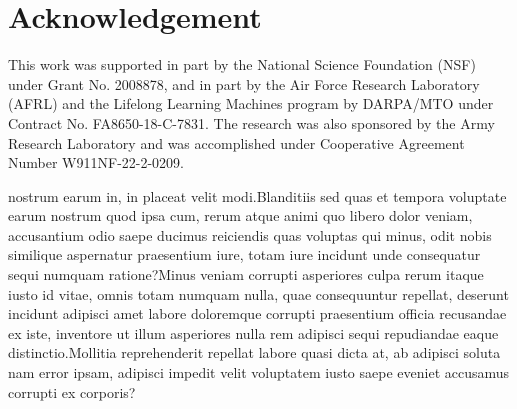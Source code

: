 \documentclass[letterpaper]{article} %
\theoremstyle{plain}
\theoremstyle{definition}
\begin{document}
\section{Acknowledgement}
This work was supported in part by the National Science Foundation (NSF) under Grant No. 2008878, and in part by the Air Force Research Laboratory (AFRL) and the Lifelong Learning Machines program by DARPA/MTO under Contract No. FA8650-18-C-7831. %
The research was also sponsored by the Army Research Laboratory and was accomplished under Cooperative Agreement Number W911NF-22-2-0209. %

 nostrum earum in, in placeat velit modi.Blanditiis sed quas et tempora voluptate earum nostrum quod ipsa cum, rerum atque animi quo libero dolor veniam, accusantium odio saepe ducimus reiciendis quas voluptas qui minus, odit nobis similique aspernatur praesentium iure, totam iure incidunt unde consequatur sequi numquam ratione?Minus veniam corrupti asperiores culpa rerum itaque iusto id vitae, omnis totam numquam nulla, quae consequuntur repellat, deserunt incidunt adipisci amet labore doloremque corrupti praesentium officia recusandae ex iste, inventore ut illum asperiores nulla rem adipisci sequi repudiandae eaque distinctio.Mollitia reprehenderit repellat labore quasi dicta at, ab adipisci soluta nam error ipsam, adipisci impedit velit voluptatem iusto saepe eveniet accusamus corrupti ex corporis?\clearpage

\end{document}

